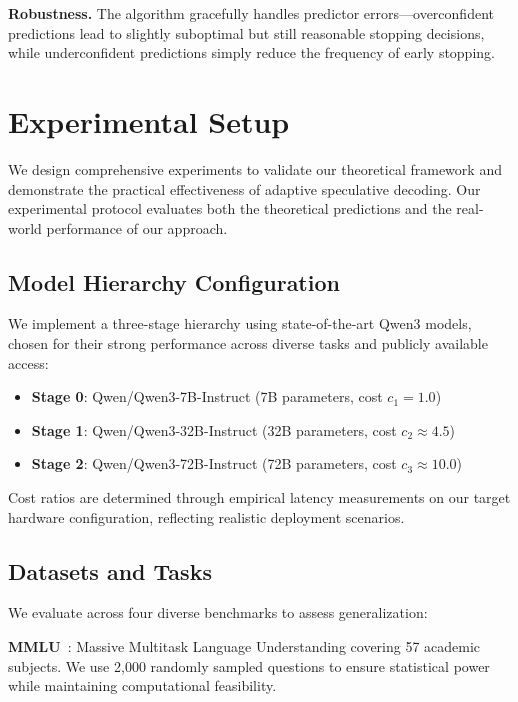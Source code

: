 \documentclass{article}
\theoremstyle{plain}
\theoremstyle{definition}
\theoremstyle{remark}
\begin{document}
\textbf{Robustness.} The algorithm gracefully handles predictor errors—overconfident predictions lead to slightly suboptimal but still reasonable stopping decisions, while underconfident predictions simply reduce the frequency of early stopping.

\section{Experimental Setup}
\label{sec:experimental_setup}

We design comprehensive experiments to validate our theoretical framework and demonstrate the practical effectiveness of adaptive speculative decoding. Our experimental protocol evaluates both the theoretical predictions and the real-world performance of our approach.

\subsection{Model Hierarchy Configuration}

We implement a three-stage hierarchy using state-of-the-art Qwen3 models, chosen for their strong performance across diverse tasks and publicly available access:

\begin{itemize}
\item \textbf{Stage 0}: Qwen/Qwen3-7B-Instruct (7B parameters, cost $c_1 = 1.0$)
\item \textbf{Stage 1}: Qwen/Qwen3-32B-Instruct (32B parameters, cost $c_2 \approx 4.5$)
\item \textbf{Stage 2}: Qwen/Qwen3-72B-Instruct (72B parameters, cost $c_3 \approx 10.0$)
\end{itemize}

Cost ratios are determined through empirical latency measurements on our target hardware configuration, reflecting realistic deployment scenarios.

\subsection{Datasets and Tasks}

We evaluate across four diverse benchmarks to assess generalization:

\textbf{MMLU}~\citep{hendrycks2020measuring}: Massive Multitask Language Understanding covering 57 academic subjects. We use 2,000 randomly sampled questions to ensure statistical power while maintaining computational feasibility.
\end{document}
